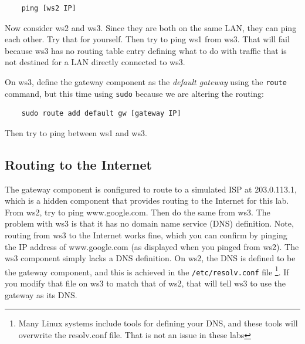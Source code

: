 \begin{verbatim}
    ping [ws2 IP]
\end{verbatim}

Now consider ws2 and ws3.  Since they are both on the same LAN, they can ping
each other.  Try that for yourself.  Then try to ping ws1 from ws3.  That will
fail because ws3 has no routing table entry defining what to do with traffic
that is not destined for a LAN directly connected to ws3.

On ws3, define the gateway component as the \textit{default gateway} using the
\texttt{route} command, but this time using \texttt{sudo} because we are altering the routing:

\begin{verbatim}
    sudo route add default gw [gateway IP]
\end{verbatim}
\noindent Then try to ping between ws1 and ws3.

\subsection{Routing to the Internet}
The gateway component is configured to route to a simulated ISP at 203.0.113.1, which
is a hidden component that provides routing to the Internet for this lab.  From ws2,
try to ping www.google.com.  Then do the same from ws3.  The problem with ws3 is that
it has no domain name service (DNS) definition.  Note, routing from ws3 to the Internet
works fine, which you can confirm by pinging the IP address of www.google.com (as displayed
when you pinged from ws2).  The ws3 component simply lacks a DNS definition.
On ws2, the DNS is defined to be the
gateway component, and this is achieved in the \texttt{/etc/resolv.conf} file \footnote{
Many Linux systems include tools for defining your DNS, and these tools will overwrite
the resolv.conf file.  That is not an issue in these labs}.  If you
modify that file on ws3 to match that of ws2, that will tell ws3 to use the gateway
as its DNS.

